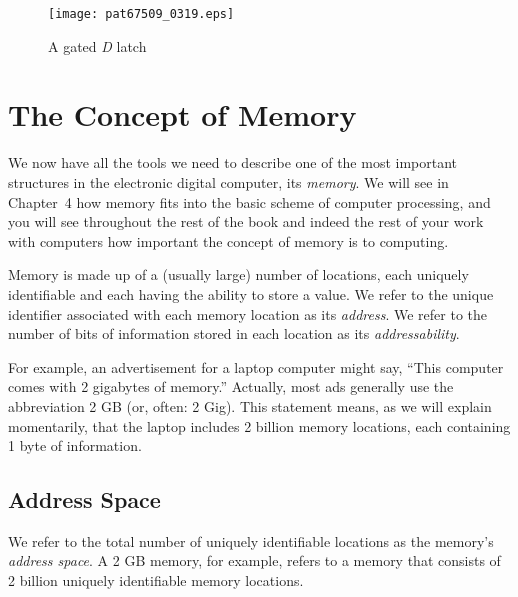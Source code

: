 \documentclass{patt}
\begin{document}
\begin{figure}
\centerline{\texttt{[image: pat67509\_0319.eps]}}
\caption{A gated {\itshape D} latch}
\label{fig:gatedDlatch}
\end{figure}


\FloatBarrier
\section{The Concept of Memory}

We now have all the tools we need to describe one of the most
important structures in the electronic digital computer, its {\em
  memory}.  We will see in Chapter~4 how memory fits into the
 basic scheme of computer processing, and you will see
throughout the rest of the book and indeed the rest of your work with
computers how important the concept of memory is to computing.

Memory is made up of a (usually large) number of locations, each
uniquely identifiable and each having the ability to store a value.
We refer to the unique identifier associated with each memory location
as its {\em address}.   We refer to the number of bits
\lightbulb[-18pt]
of information stored in each location as its {\em addressability}.

For example, an advertisement for a laptop computer might say,
``This computer comes with 2 gigabytes of memory.''  Actually, most
ads generally use the abbreviation 2 GB (or, often: 2 Gig).  This statement 
means, as we will explain momentarily, that the laptop includes 
2 billion memory locations, each containing 1 byte of information.

\subsection{Address Space}

We refer to the total number of uniquely identifiable locations as the
memory's {\em address space}.  A 2 GB memory, for example, refers
 to a memory that consists of 2 billion uniquely
identifiable memory locations.
\end{document}
